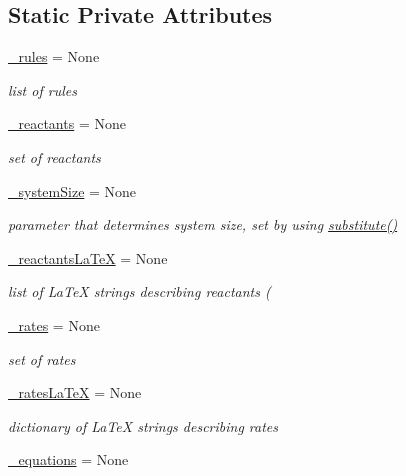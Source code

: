 \subsection*{Static Private Attributes}
\begin{DoxyCompactItemize}
\item 
\hyperlink{class_mu_mo_t_1_1_mu_mo_tmodel_a3bffcba47fea374758cdf6e1abc66b6a}{\+\_\+rules} = None
\begin{DoxyCompactList}\small\item\em list of rules \end{DoxyCompactList}\item 
\hyperlink{class_mu_mo_t_1_1_mu_mo_tmodel_ab78b4926218dd610cd20b0fd9816f96b}{\+\_\+reactants} = None
\begin{DoxyCompactList}\small\item\em set of reactants \end{DoxyCompactList}\item 
\hyperlink{class_mu_mo_t_1_1_mu_mo_tmodel_afaae7e86425ed04f1e39b4bb8039b1b4}{\+\_\+system\+Size} = None
\begin{DoxyCompactList}\small\item\em parameter that determines system size, set by using \hyperlink{class_mu_mo_t_1_1_mu_mo_tmodel_a2eec4a3b8deda7c717c06ed89c24d570}{substitute()} \end{DoxyCompactList}\item 
\hyperlink{class_mu_mo_t_1_1_mu_mo_tmodel_accfd4bbcd94ec3ce4a064fec53921700}{\+\_\+reactants\+La\+TeX} = None
\begin{DoxyCompactList}\small\item\em list of La\+TeX strings describing reactants ( \end{DoxyCompactList}\item 
\hyperlink{class_mu_mo_t_1_1_mu_mo_tmodel_a45fe1a3c95be7c7db64a0199619569a9}{\+\_\+rates} = None
\begin{DoxyCompactList}\small\item\em set of rates \end{DoxyCompactList}\item 
\hyperlink{class_mu_mo_t_1_1_mu_mo_tmodel_a795ce014c05817c0ac931270e961020f}{\+\_\+rates\+La\+TeX} = None
\begin{DoxyCompactList}\small\item\em dictionary of La\+TeX strings describing rates \end{DoxyCompactList}\item 
\hyperlink{class_mu_mo_t_1_1_mu_mo_tmodel_ab9682b098aac7aac3179a3773749fd71}{\+\_\+equations} = None

\end{DoxyCompactItemize}
